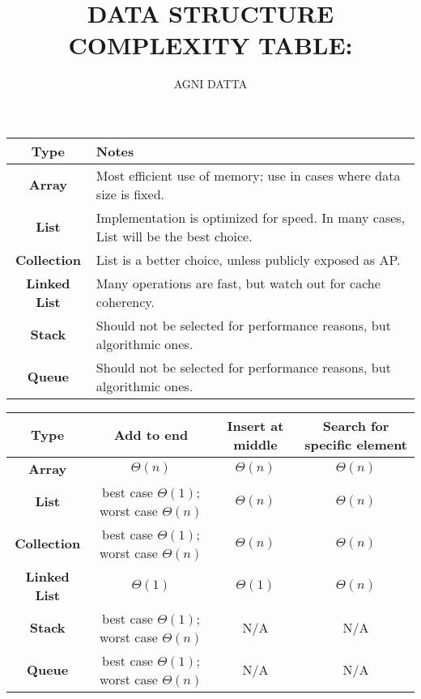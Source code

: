 \documentclass[12pt,american]{article}
\providecommand{\tabularnewline}{\\}
\providecommand{\tabularnewline}{\\}
\begin{document}
\title{\textbf{DATA STRUCTURE COMPLEXITY TABLE:}}
\author{AGNI DATTA}

\maketitle
\vfill{}

\begin{center}
\begin{tabular}{|c|l|}
\hline 
\textbf{\small{}Type} & \textbf{\small{}Notes}\tabularnewline
\hline 
\hline 
\textbf{\small{}Array} & {\small{}Most efficient use of memory; use in cases where data size
is fixed.}\tabularnewline
\hline 
\textbf{\small{}List} & {\small{}Implementation is optimized for speed. In many cases, List
will be the best choice.}\tabularnewline
\hline 
\textbf{\small{}Collection} & {\small{}List is a better choice, unless publicly exposed as AP.}\tabularnewline
\hline 
\textbf{\small{}Linked List} & {\small{}Many operations are fast, but watch out for cache coherency.}\tabularnewline
\hline 
\textbf{\small{}Stack} & {\small{}Should not be selected for performance reasons, but algorithmic
ones.}\tabularnewline
\hline 
\textbf{\small{}Queue} & {\small{}Should not be selected for performance reasons, but algorithmic
ones.}\tabularnewline
\hline 
\end{tabular}
\par\end{center}

\begin{center}
{\small{}\smallskip{}
}{\small\par}
\par\end{center}

\begin{center}
\begin{tabular}{|c|c|c|c|}
\hline 
\textbf{\small{}Type} & \textbf{\small{}Add to end} & \textbf{\small{}Insert at middle} & \textbf{\small{}Search for specific element}\tabularnewline
\hline 
\hline 
\textbf{\small{}Array} & {\small{}$\Theta(n)$} & {\small{}$\Theta(n)$} & {\small{}$\Theta(n)$}\tabularnewline
\hline 
\textbf{\small{}List} & {\small{}best case $\Theta(1)$; worst case $\Theta(n)$} & {\small{}$\Theta(n)$} & {\small{}$\Theta(n)$}\tabularnewline
\hline 
\textbf{\small{}Collection} & {\small{}best case $\Theta(1)$; worst case $\Theta(n)$} & {\small{}$\Theta(n)$} & {\small{}$\Theta(n)$}\tabularnewline
\hline 
\textbf{\small{}Linked List} & {\small{}$\Theta(1)$} & {\small{}$\Theta(1)$} & {\small{}$\Theta(n)$}\tabularnewline
\hline 
\textbf{\small{}Stack} & {\small{}best case $\Theta(1)$; worst case $\Theta(n)$} & {\small{}N/A} & {\small{}N/A}\tabularnewline
\hline 
\textbf{\small{}Queue} & {\small{}best case $\Theta(1)$; worst case $\Theta(n)$} & {\small{}N/A} & {\small{}N/A}\tabularnewline
\hline 
\end{tabular}
\par\end{center}
\end{document}
